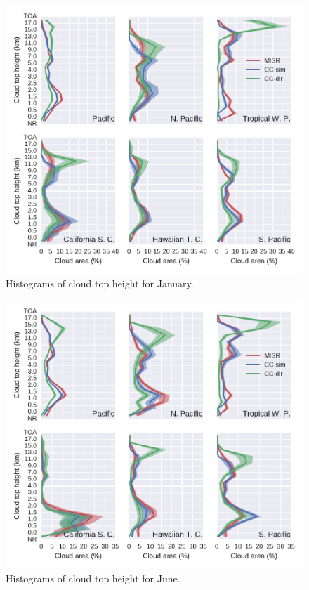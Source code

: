\begin{figure}[htbp]
\centering
\includegraphics{graphics/misr_cth_2008-01.pdf}
\caption{\label{fig:misr_cth_region_january}Histograms of cloud top
height for January.}\label{fig:misrux5fcthux5fregionux5fjanuary}
\end{figure}

\begin{figure}[htbp]
\centering
\includegraphics{graphics/misr_cth_2008-06.pdf}
\caption{\label{fig:misr_cth_region_june}Histograms of cloud top height
for June.}\label{fig:misrux5fcthux5fregionux5fjune}
\end{figure}

